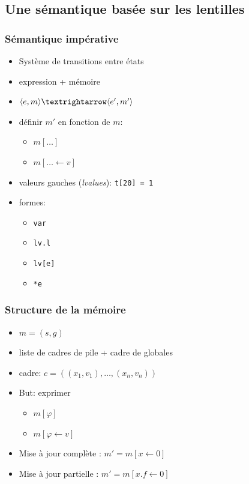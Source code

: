 \documentclass{beamer}
\begin{document}
\begin{frame}
\end{frame}

\subsection{Une sémantique basée sur les lentilles}

\begin{frame}
\frametitle{Sémantique impérative}

\begin{itemize}
\item
  Système de transitions entre états
\item
  expression + mémoire
\item
  $\mm{m}{e}{m'}{e'}$
\item
  définir $m'$ en fonction de $m$:

  \begin{itemize}
  \item $m[…]$
  \item $m[… ← v]$
  \end{itemize}
\end{itemize}

\end{frame}

\begin{frame}
    \begin{itemize}
        \item valeurs gauches (\emph{lvalues}): \texttt{t[20] = 1}
        \item formes:
            \begin{itemize}
                \item \texttt{var}
                \item \texttt{lv.l}
                \item \texttt{lv[e]}
                \item \texttt{*e}
            \end{itemize}
    \end{itemize}
\end{frame}

\begin{frame}
\frametitle{Structure de la mémoire}

\begin{itemize}
\item $m = (s, g)$
\item liste de cadres de pile + cadre de globales
\item cadre: $c = ((x_1, v_1), …, (x_n, v_n))$
\item But: exprimer

  \begin{itemize}
  \item $m[φ]$
  \item $m[φ←v]$
  \end{itemize}
\item Mise à jour complète : $m' = m[ x ← 0]$
\item Mise à jour partielle : $m' = m[x.f ← 0]$
\end{itemize}
\end{frame}
\end{document}
